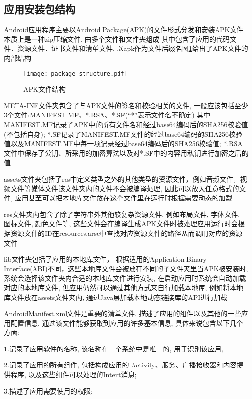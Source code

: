 \subsection{应用安装包结构}
Android应用程序主要以Android Package(APK)的文件形式分发和安装\juhao APK文件本质上是一种zip压缩文件, 由多个文件和文件夹组成 其中包含了应用的代码文件、资源文件、证书文件和清单文件, 以apk作为文件后缀名\juhao 图\ref{packageStructure}给出了APK文件的内部结构\juhao
\begin{figure}[ht]
	\centering
	\texttt{[image: package\_structure.pdf]}
	\caption{APK文件结构}
	\label{packageStructure}
\end{figure}

META-INF文件夹包含了与APK文件的签名和校验相关的文件, 一般应该包括至少3个文件:MANIFEST.MF、*.RSA、*.SF(“*”表示文件名不确定)\juhao 
其中MANIFEST.MF记录了APK中的所有文件名和经过base64编码后的SHA256校验值(不包括自身);
*.SF记录了MANIFEST.MF文件的经过base64编码的SHA256校验值以及MANIFEST.MF中每一项记录经过base64编码后的SHA256校验值;
*.RSA文件中保存了公钥、所采用的加密算法以及对*.SF中的内容用私钥进行加密之后的值\juhao

assets文件夹包括了res中定义类型之外的其他类型的资源文件，例如音频文件，视频文件等媒体文件\juhao 该文件夹内的文件不会被编译处理, 因此可以放入任意格式的文件, 应用甚至可以把本地库文件放在这个文件里在运行时根据需要动态的加载\juhao

res文件夹内包含了除了字符串外其他较复杂资源文件, 例如布局文件, 字体文件, 图标文件, 颜色文件等, 这些文件会在编译生成APK文件时被处理\juhao 应用运行时会根据资源文件的ID在resources.arsc中查找对应资源文件的路径从而调用对应的资源文件\juhao

lib文件夹包括了应用的本地库文件， 根据适用的Application Binary Interface(ABI)不同，这些本地库文件会被放在不同的子文件夹里\juhao 当APK被安装时, 系统会选择该文件夹内合适的本地库文件进行安装, 在启动应用时系统会自动加载对应的本地库文件, 但应用仍然可以通过其他方式来自行加载本地库, 例如将本地库文件放在assets文件夹内, 通过Java层加载本地动态链接库的API进行加载\juhao

AndroidManifest.xml文件是重要的清单文件, 描述了应用的组件以及其他的一些应用配置信息, 通过该文件能够获取到应用的许多基本信息, 具体来说包含以下几个方面:

1.记录了应用软件的名称, 该名称在一个系统中是唯一的, 用于识别该应用;

2.记录了应用的所有组件, 包括构成应用的 Activity、服务、广播接收器和内容提供程序, 以及这些组件可以处理的Intent消息;

3.描述了应用需要使用的权限;

